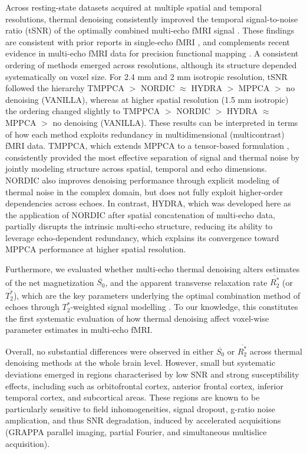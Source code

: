 Across resting-state datasets acquired at multiple spatial and temporal resolutions, thermal denoising consistently improved the temporal signal-to-noise ratio (tSNR) of the optimally combined multi-echo fMRI signal \citep{posse1999enhancement, liuGeometricViewSignal2022a}. These findings are consistent with prior reports in single-echo fMRI \citep{fernandesMPPCADenoisingFMRI2023a, comby2023denoising, veraart2016denoising}, and complements recent evidence in multi-echo fMRI data for precision functional mapping \citep{moserMultiechoAcquisitionThermal2025, krimmelHumanBrainstemsRed2025}. A consistent ordering of methods emerged across resolutions, although its structure depended systematically on voxel size. For  2.4 mm and 2 mm isotropic resolution, tSNR followed the hierarchy TMPPCA $>$ NORDIC  $\approx$ HYDRA $>$ MPPCA $>$ no denoising (VANILLA), whereas at higher spatial resolution (1.5 mm isotropic) the ordering changed slightly to TMPPCA $>$ NORDIC $>$ HYDRA $\approx$ MPPCA $>$ no denoising (VANILLA). These results can be interpreted in terms of how each method exploits redundancy in multidimensional (multicontrast) fMRI data. TMPPCA, which extends MPPCA to a tensor-based formulation \citep{olesenTensorDenoisingMultidimensional2023}, consistently provided the most effective separation of signal and thermal noise by jointly modeling structure across spatial, temporal and echo dimensions. NORDIC also improves denoising performance through explicit modeling of thermal noise in the complex domain, but does not fully exploit higher-order dependencies across echoes. In contrast, HYDRA, which was developed here as the application of NORDIC after spatial concatenation of multi-echo data, partially disrupts the intrinsic multi-echo structure, reducing its ability to leverage echo-dependent redundancy, which explains its convergence toward MPPCA performance at higher spatial resolution.

Furthermore, we evaluated whether multi-echo thermal denoising alters estimates of the net magnetization $\overline{S_0}$, and the apparent transverse relaxation rate $\overline{R_2^*}$ (or $\overline{T_2^*}$), which are the key parameters underlying the optimal combination method of echoes through $T_2^*$-weighted signal modelling \citep{posse1999enhancement, kundu2017multi, liuGeometricViewSignal2022a}. To our knowledge, this constitutes the first systematic evaluation of how thermal denoising affect voxel-wise parameter estimates in multi-echo fMRI. 

Overall, no substantial differences were observed in either $\overline{S_0}$ or $\overline{R_2^*}$ across thermal denoising methods at the whole brain level. However, small but systematic deviations emerged in regions characterised by low SNR and strong susceptibility effects, including such as orbitofrontal cortex, anterior frontal cortex, inferior temporal cortex, and subcortical areas. These regions are known to be particularly sensitive to field inhomogeneities, signal dropout, g-ratio noise amplication, and thus SNR degradation, induced by accelerated acquisitions (GRAPPA parallel imaging, partial Fourier, and simultaneous multislice acquisition). 

